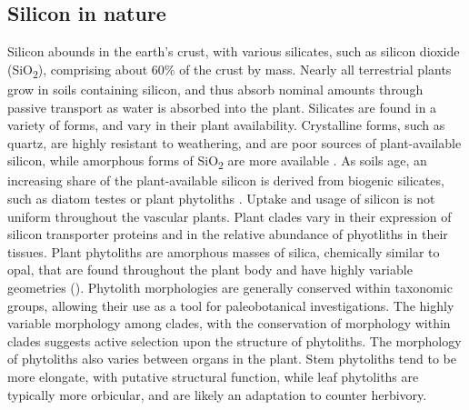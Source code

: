 \documentclass[12pt, letterpaper, ]{article}
\begin{document}
\subsection{Silicon in nature}

Silicon abounds in the earth’s crust, with various silicates, such as silicon dioxide (SiO\textsubscript{2}), comprising about 60\% of the crust by mass. Nearly all terrestrial plants grow in soils containing silicon, and thus absorb nominal amounts through passive transport as water is absorbed into the plant. Silicates are found in a variety of forms, and vary in their plant availability. Crystalline forms, such as quartz, are highly resistant to weathering, and are poor sources of plant-available silicon, while amorphous forms of SiO\textsubscript{2} are more available \cite{fraysse_surface_2009}. As soils age, an increasing share of the plant-available silicon is derived from biogenic silicates, such as diatom testes or plant phytoliths \cite{de_tombeur_plants_2020}. Uptake and usage of silicon is not uniform throughout the vascular plants. Plant clades vary in their expression of silicon transporter proteins and in the relative abundance of phyotliths in their tissues. Plant phytoliths are amorphous masses of silica, chemically similar to opal, that are found throughout the plant body and have highly variable geometries (\cite{piperno_phytoliths_2006}). Phytolith morphologies are generally conserved within taxonomic groups, allowing their use as a tool for paleobotanical investigations. The highly variable morphology among clades, with the conservation of morphology within clades suggests active selection upon the structure of phytoliths. The morphology of phytoliths also varies between organs in the plant. Stem phytoliths tend to be more elongate, with putative structural function, while leaf phytoliths are typically more orbicular, and are likely an adaptation to counter herbivory.
\end{document}
